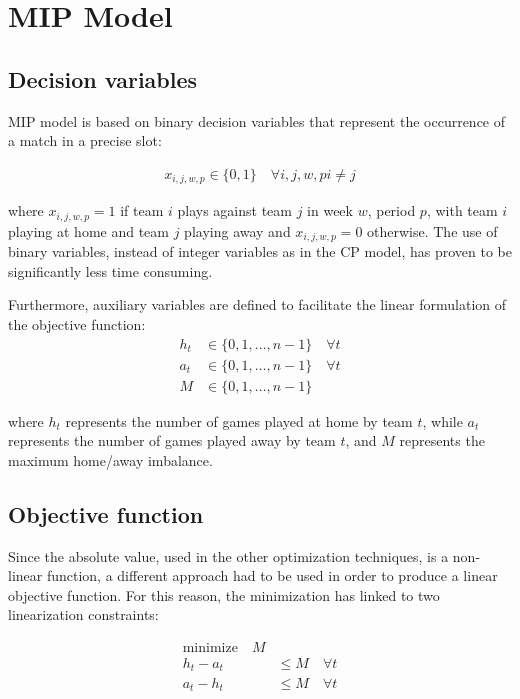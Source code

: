 \documentclass{article}
\begin{document}
\section{MIP Model}

\subsection{Decision variables}

MIP model is based on binary decision variables that represent the occurrence of a match in a precise slot:

\begin{align}
x_{i,j,w,p} \in \{0,1\} \quad \forall i,j, w, p i \neq j
\end{align}

where $x_{i,j,w,p} = 1$ if team $i$ plays against team $j$ in week $w$, period $p$, with team $i$ playing at home and team $j$ playing away and $x_{i,j,w,p} = 0$ otherwise. The use of binary variables, instead of integer variables as in the CP model, has proven to be significantly less time consuming.

Furthermore, auxiliary variables are defined to facilitate the linear formulation of the objective function:
\begin{align}
h_t &\in \{0, 1, \ldots, n-1\} \quad \forall t \\
a_t &\in \{0, 1, \ldots, n-1\} \quad \forall t \\
M &\in \{0, 1, \ldots, n-1\}
\end{align}

where $h_t$ represents the number of games played at home by team $t$, while $a_t$ represents the number of games played away by team $t$, and $M$ represents the maximum home/away imbalance.


\subsection{Objective function}
Since the absolute value, used in the other optimization techniques, is a non-linear function, a different approach had to be used in order to produce a linear objective function. 
For this reason, the minimization has linked to two linearization constraints:

\begin{align}
\text{minimize} \quad M \\
h_t - a_t &\leq M \quad \forall t \\
a_t - h_t &\leq M \quad \forall t
\end{align}
\end{document}
